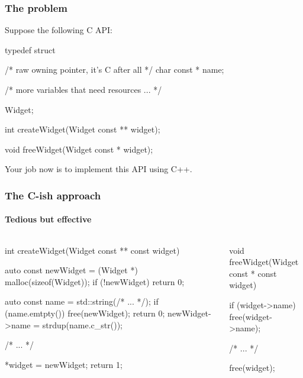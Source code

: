 \documentclass{beamer}
\begin{document}

\begin{frame}[fragile]
\frametitle{The problem}
Suppose the following C API:

\begin{C++}
typedef struct
{
    /* raw owning pointer, it's C after all */
    char const * name;

    /* more variables that need resources ... */
} Widget;

int createWidget(Widget const ** widget);

void freeWidget(Widget const * widget);
\end{C++}

Your job now is to implement this API using C++.
\end{frame}


\begin{frame}[fragile]
\frametitle{The C-ish approach}
\framesubtitle{Tedious but effective}
\begin{columns}
\begin{column}{0.45\textwidth}
\begin{TinyC++}
int createWidget(Widget const ** const widget)
{
	auto const newWidget = (Widget *) malloc(sizeof(Widget));
	if (!newWidget)
	{
		return 0;
	}
    
	auto const name = std::string(/* ... */);
	if (name.emtpty())
	{
		free(newWidget);
		return 0;
	}
	newWidget->name = strdup(name.c_str());
    
	/* ... */
    
	*widget = newWidget;
	return 1;
}
\end{TinyC++}
\end{column}
\begin{column}{0.45\textwidth}
\begin{TinyC++}
void freeWidget(Widget const * const widget)
{
	if (widget->name)
	{
		free(widget->name);
	}
    
	/* ... */
    
	free(widget);
}
\end{TinyC++}
\end{column}
\end{columns}
\end{frame}

\end{document}

